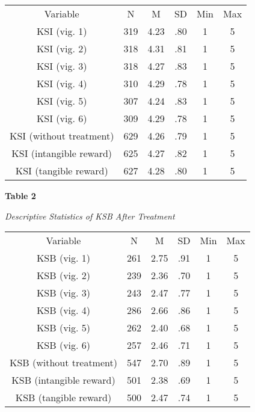 \documentclass{article}
\begin{document}
\begin{table}

  
\begin{tabular}{c  c  c  c  c  c}

  Variable & N & M & SD & Min & Max\\
KSI (vig. 1) & 319 & 4.23 & .80 & 1 & 5\\
KSI (vig. 2) & 318 & 4.31 & .81 & 1 & 5\\
KSI (vig. 3) & 318 & 4.27 & .83 & 1 & 5\\
KSI (vig. 4) & 310 & 4.29 & .78 & 1 & 5\\
KSI (vig. 5) & 307 & 4.24 & .83 & 1 & 5\\
KSI (vig. 6) & 309 & 4.29 & .78 & 1 & 5\\
KSI (without treatment) & 629 & 4.26 & .79 & 1 & 5\\
KSI (intangible reward) & 625 & 4.27 & .82 & 1 & 5\\
KSI (tangible reward) & 627 & 4.28 & .80 & 1 & 5\\


\end{tabular}


\end{table}


\textbf{}

\textbf{Table 2}

\emph{Descriptive Statistics of KSB After Treatment}


\begin{table}

  
\begin{tabular}{c  c  c  c  c  c}

  Variable & N & M & SD & Min & Max\\
KSB (vig. 1) & 261 & 2.75 & .91 & 1 & 5\\
KSB (vig. 2) & 239 & 2.36 & .70 & 1 & 5\\
KSB (vig. 3) & 243 & 2.47 & .77 & 1 & 5\\
KSB (vig. 4) & 286 & 2.66 & .86 & 1 & 5\\
KSB (vig. 5) & 262 & 2.40 & .68 & 1 & 5\\
KSB (vig. 6) & 257 & 2.46 & .71 & 1 & 5\\
KSB (without treatment) & 547 & 2.70 & .89 & 1 & 5\\
KSB (intangible reward) & 501 & 2.38 & .69 & 1 & 5\\
KSB (tangible reward) & 500 & 2.47 & .74 & 1 & 5\\


\end{tabular}


\end{table}
\end{document}

